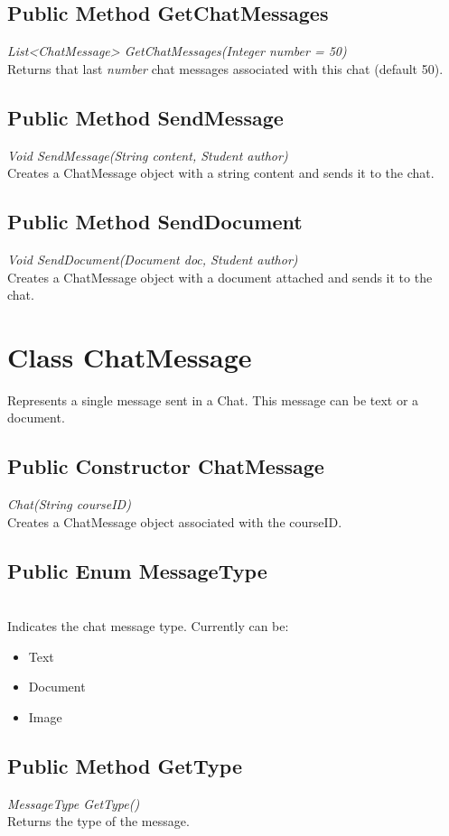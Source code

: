 \documentclass{scrreprt}
\begin{document}
\subsection{Public Method GetChatMessages}
\textit{List<ChatMessage> GetChatMessages(Integer number = 50)} \\
Returns that last \textit{number} chat messages associated with this chat (default 50).

\subsection{Public Method SendMessage}
\textit{Void SendMessage(String content, Student author)} \\
Creates a ChatMessage object with a string content and sends it to the chat.

\subsection{Public Method SendDocument}
\textit{Void SendDocument(Document doc, Student author)} \\
Creates a ChatMessage object with a document attached and sends it to the chat.

\section{Class ChatMessage}
Represents a single message sent in a Chat. This message can be text or a document.

\subsection{Public Constructor ChatMessage}
\textit{Chat(String courseID)} \\
Creates a ChatMessage object associated with the courseID.

\subsection{Public Enum MessageType}
\textit{} \\
Indicates the chat message type. Currently can be:
\begin{itemize}
	\item Text
	\item Document
	\item Image
\end{itemize}

\subsection{Public Method GetType}
\textit{MessageType GetType()} \\
Returns the type of the message.
\end{document}
